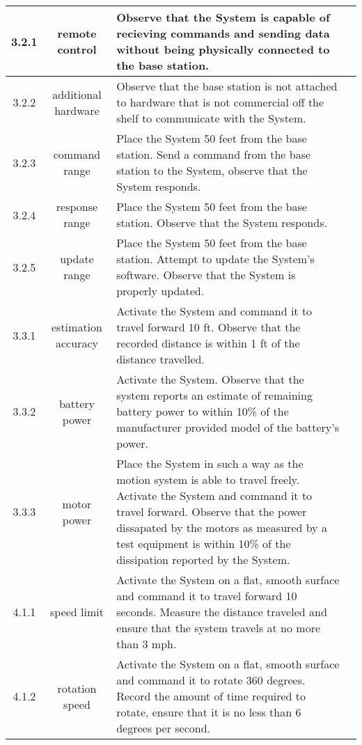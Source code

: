 \documentclass[12pt]{article}
\begin{document}
\begin{tabular}{c|c|p{8cm}|c}
  \hline
  3.2.1 & remote control & Observe that the System is capable of recieving commands and sending data without being physically connected to the base station. & \\\hline
  3.2.2 & additional hardware & Observe that the base station is not attached to hardware that is not commercial off the shelf to communicate with the System. & \\\hline
  3.2.3 & command range & Place the System 50 feet from the base station. Send a command from the base station to the System, observe that the System responds. & \\\hline
  3.2.4 & response range & Place the System 50 feet from the base station. Observe that the System responds. & \\\hline
  3.2.5 & update range & Place the System 50 feet from the base station. Attempt to update the System's software.  Observe that the System is properly updated. & \\\hline
  3.3.1 & estimation accuracy & Activate the System and command it to travel forward 10 ft.  Observe that the recorded distance is within 1 ft of the distance travelled. & \\\hline
  3.3.2 & battery power & Activate the System.  Observe that the system reports an estimate of remaining battery power to within 10\% of the manufacturer provided model of the battery's power. & \\\hline
  3.3.3 & motor power & Place the System in such a way as the motion system is able to travel freely.  Activate the System and command it to travel forward.  Observe that the power dissapated by the motors as measured by a test equipment is within 10\% of the dissipation reported by the System. & \\\hline
  4.1.1 & speed limit & Activate the System on a flat, smooth surface and command it to travel forward 10 seconds.  Measure the distance traveled and ensure that the system travels at no more than 3 mph. & \\\hline
  4.1.2 & rotation speed & Activate the System on a flat, smooth surface and command it to rotate 360 degrees.  Record the amount of time required to rotate, ensure that it is no less than 6 degrees per second. & \\\hline

\end{tabular}
\end{document}
